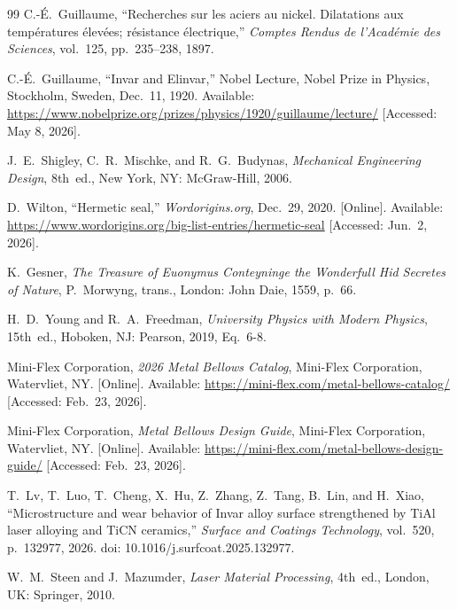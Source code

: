 \documentclass[12pt, letterpaper]{report}%
\begin{document}
\begin{thebibliography}{99}
	C.-\'{E}.\ Guillaume,
	``Recherches sur les aciers au nickel. Dilatations aux temp\'{e}ratures
	\'{e}lev\'{e}es; r\'{e}sistance \'{e}lectrique,''
	\textit{Comptes Rendus de l'Acad\'{e}mie des Sciences},
	vol.~125, pp.~235--238, 1897.

	C.-\'{E}.\ Guillaume, ``Invar and Elinvar,'' Nobel Lecture,
	Nobel Prize in Physics, Stockholm, Sweden, Dec.\ 11, 1920.
	Available: \url{https://www.nobelprize.org/prizes/physics/1920/guillaume/lecture/}
	[Accessed: May 8, 2026].

	J.\ E.\ Shigley, C.\ R.\ Mischke, and R.\ G.\ Budynas,
	\textit{Mechanical Engineering Design},
	8th~ed., New York, NY: McGraw-Hill, 2006.

	D.\ Wilton, ``Hermetic seal,'' \textit{Wordorigins.org}, Dec.\ 29, 2020.
	[Online]. Available: \url{https://www.wordorigins.org/big-list-entries/hermetic-seal}
	[Accessed: Jun.\ 2, 2026].

	K.\ Gesner, \textit{The Treasure of Euonymus Conteyninge the Wonderfull Hid
	Secretes of Nature}, P.\ Morwyng, trans., London: John Daie, 1559, p.~66.

	H.\ D.\ Young and R.\ A.\ Freedman,
	\textit{University Physics with Modern Physics},
	15th~ed., Hoboken, NJ: Pearson, 2019, Eq.~6-8.

	Mini-Flex Corporation, \textit{2026 Metal Bellows Catalog},
	Mini-Flex Corporation, Watervliet, NY. [Online].
	Available: \url{https://mini-flex.com/metal-bellows-catalog/}
	[Accessed: Feb.\ 23, 2026].

	Mini-Flex Corporation, \textit{Metal Bellows Design Guide},
	Mini-Flex Corporation, Watervliet, NY. [Online].
	Available: \url{https://mini-flex.com/metal-bellows-design-guide/}
	[Accessed: Feb.\ 23, 2026].

	T.\ Lv, T.\ Luo, T.\ Cheng, X.\ Hu, Z.\ Zhang, Z.\ Tang, B.\ Lin, and H.\ Xiao,
	``Microstructure and wear behavior of Invar alloy surface strengthened by
	{TiAl} laser alloying and {TiCN} ceramics,''
	\textit{Surface and Coatings Technology}, vol.~520, p.~132977, 2026.
	doi: 10.1016/j.surfcoat.2025.132977.

	W.\ M.\ Steen and J.\ Mazumder, \textit{Laser Material Processing},
	4th~ed., London, UK: Springer, 2010.


\end{thebibliography}
\end{document}
